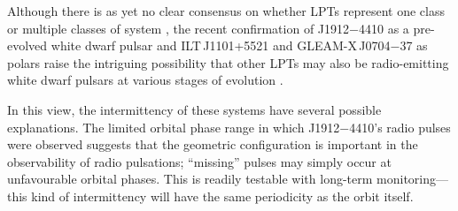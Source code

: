 \documentclass[fleqn,usenatbib]{mnras}
\newcommand{\todo}[1]{{\color{red}#1}}
\begin{document}


Although there is as yet no clear consensus on whether LPTs represent one class or multiple classes of system \citep[e.g.][]{2024ApJ...961..214R}, the recent confirmation of J1912$-$4410 as a pre-evolved white dwarf pulsar \citep{2023NatAs...7..931P} and ILT\,J1101+5521 and GLEAM-X\,J0704$-$37 as polars \citep{2024arXiv240811536D,2025arXiv250103315R} raise the intriguing possibility that other LPTs may also be radio-emitting white dwarf pulsars at various stages of evolution \citep{2021NatAs...5..648S}.

In this view, the intermittency of these systems have several possible explanations.
The limited orbital phase range in which J1912$-$4410's radio pulses were observed suggests that the geometric configuration is important in the observability of radio pulsations; ``missing'' pulses may simply occur at unfavourable orbital phases.
This is readily testable with long-term monitoring---this kind of intermittency will have the same periodicity as the orbit itself.
\end{document}
